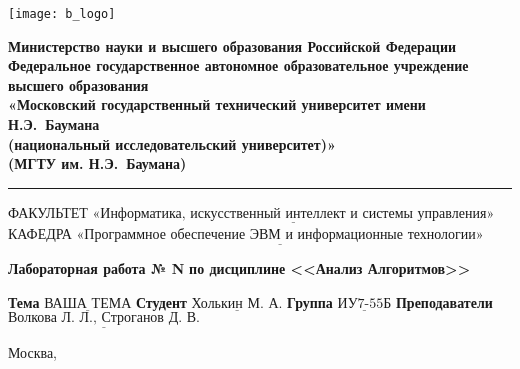 \thispagestyle{empty}

\noindent \begin{minipage}{0.15\textwidth}
	\texttt{[image: b\_logo]}
\end{minipage}
\noindent\begin{minipage}{0.85\textwidth}\centering
	\textbf{Министерство науки и высшего образования Российской Федерации}\\
	\textbf{Федеральное государственное автономное образовательное учреждение высшего образования}\\
	\textbf{«Московский государственный технический университет имени Н.Э.~Баумана}\\
	\textbf{(национальный исследовательский университет)»}\\
	\textbf{(МГТУ им. Н.Э.~Баумана)}
\end{minipage}

\noindent\rule{\linewidth}{3pt}
\newline\newline
\noindent ФАКУЛЬТЕТ $\underline{\text{«Информатика, искусственный интеллект и системы управления»}}$ \newline\newline
\noindent КАФЕДРА $\underline{\text{«Программное обеспечение ЭВМ и информационные технологии»}}$

\vspace{1cm}

\begin{center}
	\noindent\begin{minipage}{1.3\textwidth}\centering
		\Large\textbf{  Лабораторная работа № N}\newline
		\textbf{по дисциплине <<Анализ Алгоритмов>>}\newline\newline
	\end{minipage}
\end{center}

\noindent\textbf{Тема} $\underline{\text{ВАША ТЕМА}}$\newline\newline
\noindent\textbf{Студент} $\underline{\text{Холькин~М.~А.}}$\newline\newline
\noindent\textbf{Группа} $\underline{\text{ИУ7-55Б}}$\newline\newline
\noindent\textbf{Преподаватели} $\underline{\text{Волкова~Л.~Л., Строганов~Д.~В.}}$\newline

\begin{center}
	\vfill
	Москва,~\the\year
\end{center}
\clearpage
